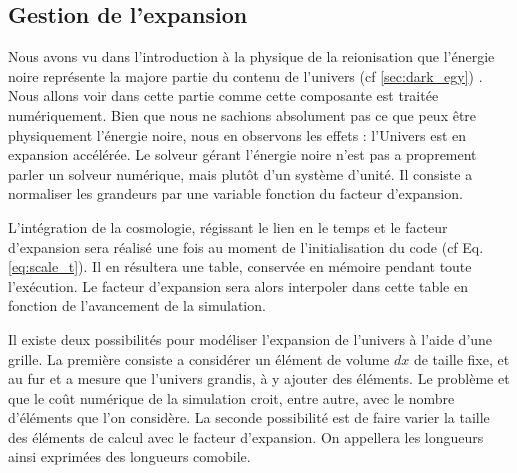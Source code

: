 


\subsection{Gestion de l'expansion}
\label{sec:supercomobil}


Nous avons vu dans l'introduction à la physique de la reionisation que l'énergie noire représente la majore partie du contenu de l'univers (cf \ref{sec:dark_egy}) .
Nous allons voir dans cette partie comme cette composante est traitée numériquement.
Bien que nous ne sachions absolument pas ce que peux être physiquement l'énergie noire, nous en observons les effets : l'Univers est en expansion accélérée.
Le solveur gérant l'énergie noire n'est pas a proprement parler un solveur numérique, mais plutôt d'un système d'unité. %
Il consiste a normaliser les grandeurs par une variable fonction du facteur d'expansion.

L'intégration de la cosmologie, régissant le lien en le temps et le facteur d'expansion sera réalisé une fois au moment de l'initialisation du code (cf Eq. \ref{eq:scale_t}).
Il en résultera une table, conservée en mémoire pendant toute l'exécution.
Le facteur d'expansion sera alors interpoler dans cette table en fonction de l'avancement de la simulation.%

Il existe deux possibilités pour modéliser l'expansion de l'univers à l'aide d'une grille.
La première consiste a considérer un élément de volume $dx$ de taille fixe, et au fur et a mesure que l'univers grandis, à y ajouter des éléments.
Le problème et que le coût numérique de la simulation croit, entre autre, avec le nombre d'éléments que l'on considère.
La seconde possibilité est de faire varier la taille des éléments de calcul avec le facteur d'expansion.
On appellera les longueurs ainsi exprimées des longueurs comobile.

